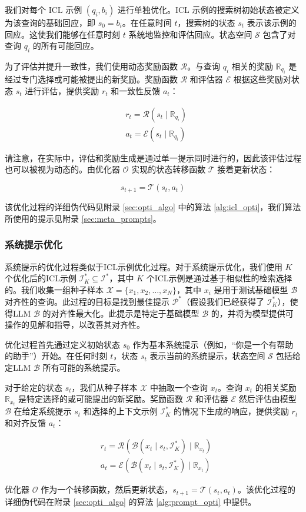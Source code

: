 我们对每个 ICL 示例 $(q_i, b_i)$ 进行单独优化。ICL 示例的搜索树初始状态被定义为该查询的基础回应，即 $s_0 = b_i$。在任意时间 $t$，搜索树的状态 $s_t$ 表示该示例的回应。这使我们能够在任意时刻 $t$ 系统地监控和评估回应。状态空间 $\mathcal{S}$ 包含了对查询 $q_i$ 的所有可能回应。

为了评估并提升一致性，我们使用动态奖励函数 $\mathcal{R}$。与查询 $q_i$ 相关的奖励 $\mathbb{R}_{q_i}$ 是经过专门选择或可能被提出的新奖励。奖励函数 $\mathcal{R}$ 和评估器 $\mathcal{E}$ 根据这些奖励对状态 $s_t$ 进行评估，提供奖励 $r_t$ 和一致性反馈 $a_t$：

\[
\begin{aligned}
& r_t = \mathcal{R}(s_t \mid \mathbb{R}_{q_i}) \\
& a_t = \mathcal{E}(s_t \mid \mathbb{R}_{q_i})
\end{aligned}
\]

请注意，在实际中，评估和奖励生成是通过单一提示同时进行的，因此该评估过程也可以被视为动态的。由优化器 $\mathcal{O}$ 实现的状态转移函数 $\mathcal{T}$ 接着更新状态：

\[
s_{t+1} = \mathcal{T}(s_t, a_t)
\]

该优化过程的详细伪代码见附录 \ref{sec:opti_algo} 中的算法 \ref{alg:icl_opti}，我们算法所使用的提示见附录 \ref{sec:meta_prompts}。
\subsubsection{系统提示优化}

系统提示的优化过程类似于ICL示例优化过程。对于系统提示优化，我们使用 $K$ 个优化后的ICL示例 $\mathcal{I}_K^*  \subseteq \mathcal{I}^*$，其中 $K$ 个ICL示例是通过基于相似性的检索选择的。我们收集一组种子样本 $\mathcal{X} = \{x_1, x_2, \ldots, x_N \}$，其中 $x_i$ 是用于测试基础模型 $\mathcal{B}$ 对齐性的查询。此过程的目标是找到最佳提示 $\mathcal{P}^*$（假设我们已经获得了 $\mathcal{I}_K^*$），使得LLM $\mathcal{B}$ 的对齐性最大化。此提示是特定于基础模型 $\mathcal{B}$ 的，并将为模型提供可操作的见解和指导，以改善其对齐性。

优化过程首先通过定义初始状态 $s_0$ 作为基本系统提示（例如，“你是一个有帮助的助手”）开始。在任何时刻 $t$，状态 $s_t$ 表示当前的系统提示，状态空间 $\mathcal{S}$ 包括给定LLM $\mathcal{B}$ 所有可能的系统提示。

对于给定的状态 $s_t$，我们从种子样本 $\mathcal{X}$ 中抽取一个查询 $x_t$。查询 $x_t$ 的相关奖励 $\mathbb{R}_{x_t}$ 是特定选择的或可能提出的新奖励。奖励函数 $\mathcal{R}$ 和评估器 $\mathcal{E}$ 然后评估由模型 $\mathcal{B}$ 在给定系统提示 $s_t$ 和选择的上下文示例 $\mathcal{I}_K^*$ 的情况下生成的响应，提供奖励 $r_t$ 和对齐反馈 $a_t$：

\[
\begin{aligned}
& r_t = \mathcal{R}(\mathcal{B}(x_t \mid s_t, \mathcal{I}_K^*)\mid \mathbb{R}_{x_t}) \\
& a_t = \mathcal{E}(\mathcal{B}(x_t \mid s_t, \mathcal{I}_K^*)\mid \mathbb{R}_{x_t})
\end{aligned}
\]

优化器 $\mathcal{O}$ 作为一个转移函数，然后更新状态，$ s_{t+1} = \mathcal{T}(s_t, a_t) $。该优化过程的详细伪代码在附录 \ref{sec:opti_algo} 的算法 \ref{alg:prompt_opti} 中提供。
